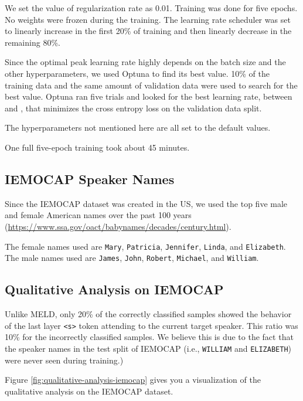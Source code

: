 \documentclass[11pt]{article}
\begin{document}
We set the value of  regularization rate as 0.01. Training was done for five epochs. No weights were frozen during the training. The learning rate scheduler was set to linearly increase in the first 20\% of training and then linearly decrease in the remaining 80\%. 

Since the optimal peak learning rate highly depends on the batch size and the other hyperparameters, we used Optuna \citep{optuna_2019} to find its best value. 10\% of the training data and the same amount of validation data were used to search for the best value. Optuna ran five trials and looked for the best learning rate, between  and , that minimizes the cross entropy loss on the validation data split.

The hyperparameters not mentioned here are all set to the default values.

One full five-epoch training took about 45 minutes.

\subsection{IEMOCAP Speaker Names} \label{sec:iemocap-speaker-names}

Since the IEMOCAP dataset was created in the US, we used the top five male and female American names over the past 100 years (\url{https://www.ssa.gov/oact/babynames/decades/century.html}).

The female names used are \texttt{Mary}, \texttt{Patricia}, \texttt{Jennifer}, \texttt{Linda}, and \texttt{Elizabeth}. The male names used are \texttt{James}, \texttt{John}, \texttt{Robert}, \texttt{Michael}, and \texttt{William}.


\subsection{Qualitative Analysis on IEMOCAP} \label{sec:qualitative-analysis-iemocap}

Unlike MELD, only 20\% of the correctly classified samples showed the behavior of the last layer \texttt{<s>} token attending to the current target speaker. This ratio was 10\% for the incorrectly classified samples. We believe this is due to the fact that the speaker names in the test split of IEMOCAP (i.e., \texttt{WILLIAM} and \texttt{ELIZABETH}) were never seen during training.) 

Figure \ref{fig:qualitative-analysis-iemocap} gives you a visualization of the qualitative analysis on the IEMOCAP dataset.
\end{document}
